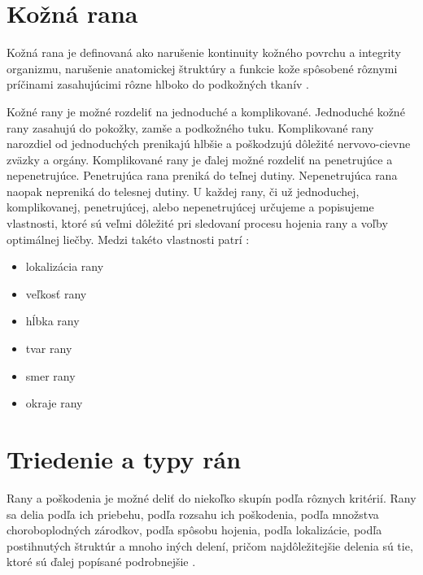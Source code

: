 \section{Kožná rana}
Kožná rana je definovaná ako narušenie kontinuity kožného povrchu a integrity organizmu, narušenie anatomickej štruktúry a funkcie kože spôsobené rôznymi príčinami zasahujúcimi rôzne hlboko do podkožných tkanív \cite{Hlinkova2015}.

Kožné rany je možné rozdeliť na jednoduché a komplikované. Jednoduché kožné rany zasahujú do pokožky, zamše a podkožného tuku. Komplikované rany narozdiel od jednoduchých prenikajú hlbšie a poškodzujú dôležité nervovo-cievne zväzky a orgány. Komplikované rany je ďalej možné rozdeliť na penetrujúce a nepenetrujúce. Penetrujúca rana preniká do teľnej dutiny. Nepenetrujúca rana naopak nepreniká do telesnej dutiny. U každej rany, či už jednoduchej, komplikovanej, penetrujúcej, alebo nepenetrujúcej určujeme a popisujeme vlastnosti, ktoré sú veľmi dôležité pri sledovaní procesu hojenia rany a voľby optimálnej liečby. Medzi takéto vlastnosti patrí \cite{pcCdSrbbhhlr5YcQ}:
\begin{itemize} 
\item lokalizácia rany
\item veľkosť rany
\item hĺbka rany
\item tvar rany
\item smer rany
\item okraje rany
\end{itemize}

\section{Triedenie a typy rán}
Rany a poškodenia je možné deliť do niekoľko skupín podľa rôznych kritérií. Rany sa delia podľa ich priebehu, podľa rozsahu ich poškodenia, podľa množstva choroboplodných zárodkov, podľa spôsobu hojenia, podľa lokalizácie, podľa postihnutých štruktúr a mnoho iných delení, pričom najdôležitejšie delenia sú tie, ktoré sú ďalej popísané podrobnejšie \cite{Hlinkova2015}.

